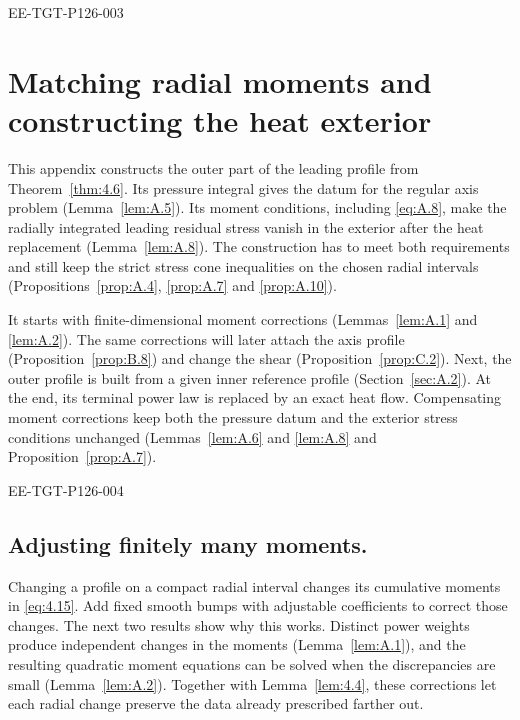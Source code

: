 \begin{EESegment}{EE-TGT-P126-003}
\appendix
\section{Matching radial moments and constructing the heat exterior}\label{sec:A}
This appendix constructs the outer part of the leading profile
 from Theorem~\ref{thm:4.6}. Its pressure integral gives
the datum  for the regular axis problem
(Lemma~\ref{lem:A.5}). Its moment conditions, including \eqref{eq:A.8}, make the
radially integrated leading residual stress  vanish in the
exterior after the heat replacement (Lemma~\ref{lem:A.8}). The construction has to meet
both requirements and still keep the strict stress cone inequalities on the chosen radial
intervals (Propositions~\ref{prop:A.4}, \ref{prop:A.7} and \ref{prop:A.10}).

It starts with finite-dimensional moment corrections (Lemmas~\ref{lem:A.1} and
\ref{lem:A.2}). The same corrections will later attach the axis profile
(Proposition~\ref{prop:B.8}) and change the shear (Proposition~\ref{prop:C.2}). Next, the
outer profile is built from a given inner reference profile (Section~\ref{sec:A.2}). At the
end, its terminal power law  is replaced by an
exact heat flow. Compensating moment corrections keep both the pressure datum and the
exterior stress conditions unchanged (Lemmas~\ref{lem:A.6} and \ref{lem:A.8} and
Proposition~\ref{prop:A.7}).
\end{EESegment}

\begin{EESegment}{EE-TGT-P126-004}
\subsection{Adjusting finitely many moments.}\label{sec:A.1}
Changing a profile on a compact radial interval changes its cumulative moments in
\eqref{eq:4.15}. Add fixed smooth bumps with adjustable coefficients to correct those
changes. The next two results show why this works. Distinct power weights produce
independent changes in the moments (Lemma~\ref{lem:A.1}), and the resulting quadratic
moment equations can be solved when the discrepancies are small
(Lemma~\ref{lem:A.2}). Together with Lemma~\ref{lem:4.4}, these corrections let each
radial change preserve the data already prescribed farther out.
\end{EESegment}

